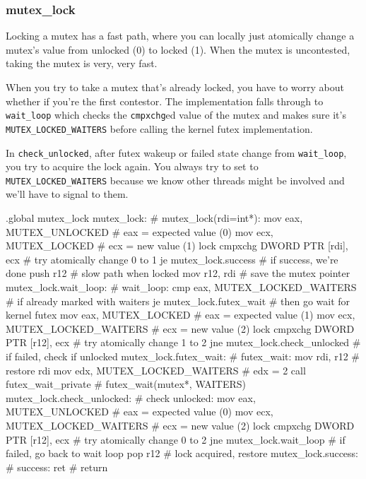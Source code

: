 \subsubsection{mutex\_lock}

Locking a mutex has a fast path, where you can locally just atomically change a
mutex's value from unlocked (0) to locked (1). When the mutex is uncontested,
taking the mutex is very, very fast.

When you try to take a mutex that's already locked, you have to worry about
whether if you're the first contestor. The implementation falls through to
\lstinline|wait_loop| which checks the \lstinline|cmpxchg|ed value of the
mutex and makes sure it's \lstinline|MUTEX_LOCKED_WAITERS| before calling the
kernel futex implementation.

In \lstinline|check_unlocked|, after futex wakeup or failed state change from
\lstinline|wait_loop|, you try to acquire the lock again. You always try to set
to \lstinline|MUTEX_LOCKED_WAITERS| because we know other threads might be
involved and we'll have to signal to them.

\begin{asm}
.global mutex_lock
mutex_lock:				    # mutex_lock(rdi=int*):
	mov	eax, MUTEX_UNLOCKED	    #   eax = expected value (0)
	mov	ecx, MUTEX_LOCKED	    #   ecx = new value (1)
	lock cmpxchg DWORD PTR [rdi], ecx   #   try atomically change 0 to 1
	je	mutex_lock.success	    #   if success, we're done
	push	r12			    #   slow path when locked
	mov	r12, rdi		    #   save the mutex pointer
mutex_lock.wait_loop:			    # wait_loop:
	cmp	eax, MUTEX_LOCKED_WAITERS   #   if already marked with waiters
	je	mutex_lock.futex_wait	    #   then go wait for kernel futex
	mov	eax, MUTEX_LOCKED	    #   eax = expected value (1)
	mov	ecx, MUTEX_LOCKED_WAITERS   #   ecx = new value (2)
	lock cmpxchg DWORD PTR [r12], ecx   #   try atomically change 1 to 2
	jne	mutex_lock.check_unlocked   #   if failed, check if unlocked
mutex_lock.futex_wait:			    # futex_wait:
	mov	rdi, r12		    #   restore rdi
	mov	edx, MUTEX_LOCKED_WAITERS   #   edx = 2
	call	futex_wait_private	    #   futex_wait(mutex*, WAITERS)
mutex_lock.check_unlocked:		    # check unlocked:
	mov	eax, MUTEX_UNLOCKED	    #   eax = expected value (0)
	mov	ecx, MUTEX_LOCKED_WAITERS   #   ecx = new value (2)
	lock cmpxchg DWORD PTR [r12], ecx   #   try atomically change 0 to 2
	jne	mutex_lock.wait_loop	    #   if failed, go back to wait loop
	pop	r12			    #   lock acquired, restore
mutex_lock.success:			    # success:
	ret				    #   return
\end{asm}


